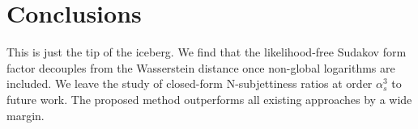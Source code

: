 \section{Conclusions}\label{sec:conclusions}

This is just the tip of the iceberg. We find that the likelihood-free
Sudakov form factor decouples from the Wasserstein distance once
non-global logarithms are included. We leave the study of closed-form
N-subjettiness ratios at order $\alpha_s^3$ to future work. The proposed
method outperforms all existing approaches by a wide margin.

